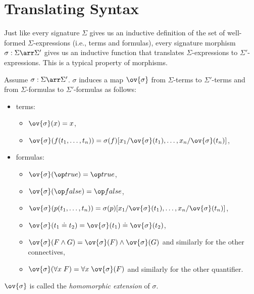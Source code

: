 \section{Translating Syntax}

Just like every signature $\Sigma$ gives us an inductive definition of the set of well-formed $\Sigma$-expressions (i.e., terms and formulas), every signature morphism $\sigma:\Sigma\arr\Sigma'$ gives us an inductive function that translates $\Sigma$-expressions to $\Sigma'$-expressions. This is a typical property of  morphisms.

\begin{definition}\label{def:fol:morphexp}
Assume $\sigma:\Sigma\arr\Sigma'$. $\sigma$ induces a map $\ov{\sigma}$ from $\Sigma$-terms to $\Sigma'$-terms and from $\Sigma$-formulas to $\Sigma'$-formulas as follows:
\begin{itemize}
\item terms:
  \begin{itemize}
    \item $\ov{\sigma}(x)=x$,
    \item $\ov{\sigma}(f(t_1,\ldots,t_n))=\sigma(f)[\sub{x_1}{\ov{\sigma}(t_1)},\ldots,\sub{x_n}{\ov{\sigma}(t_n)}]$,
  \end{itemize}
\item formulas:
   \begin{itemize}
    \item $\ov{\sigma}(\true)=\true$,
    \item $\ov{\sigma}(\false)=\false$,
    \item $\ov{\sigma}(p(t_1,\ldots,t_n))=\sigma(p)[\sub{x_1}{\ov{\sigma}(t_1)},\ldots,\sub{x_n}{\ov{\sigma}(t_n)}]$,
    \item $\ov{\sigma}(t_1\doteq t_2)=\ov{\sigma}(t_1)\doteq\ov{\sigma}(t_2)$,
    \item $\ov{\sigma}(F\wedge G)=\ov{\sigma}(F)\wedge\ov{\sigma}(G)$ and similarly for the other connectives,
    \item $\ov{\sigma}(\forall x\;F)=\forall x\;\ov{\sigma}(F)$ and similarly for the other quantifier.
   \end{itemize}
\end{itemize}
\end{definition}

\begin{remark}
$\ov{\sigma}$ is called the \emph{homomorphic extension} of $\sigma$.
\end{remark}

